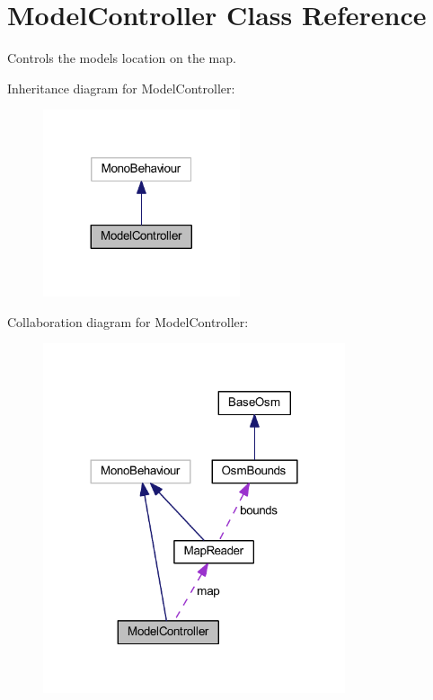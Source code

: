 \hypertarget{class_model_controller}{}\section{Model\+Controller Class Reference}
\label{class_model_controller}


Controls the models location on the map.  




Inheritance diagram for Model\+Controller\+:\nopagebreak
\begin{figure}[H]
\begin{center}
\leavevmode
\includegraphics[width=164pt]{class_model_controller__inherit__graph}
\end{center}
\end{figure}


Collaboration diagram for Model\+Controller\+:\nopagebreak
\begin{figure}[H]
\begin{center}
\leavevmode
\includegraphics[width=252pt]{class_model_controller__coll__graph}
\end{center}
\end{figure}
